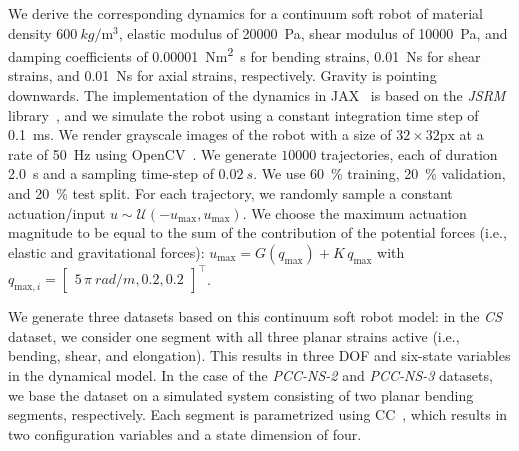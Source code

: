 We derive the corresponding dynamics for a continuum soft robot of material density $\SI{600}{kg \per \meter^3}$, elastic modulus of \SI{20000}{Pa}, shear modulus of \SI{10000}{Pa}, and damping coefficients of \SI{0.00001}{Nm^2s} for bending strains, \SI{0.01}{Ns} for shear strains, and \SI{0.01}{Ns} for axial strains, respectively.
Gravity is pointing downwards.
The implementation of the dynamics in JAX~\citep{jax2018github} is based on the \emph{JSRM} library~\citep{stolzle2024experimental, stolzle2024guiding}, and we simulate the robot using a constant integration time step of \SI{0.1}{ms}.
We render grayscale images of the robot with a size of $32 \times 32 \mathrm{px}$ at a rate of \SI{50}{Hz} using OpenCV~\citep{bradski2000opencv}. 
We generate $10000$ trajectories, each of duration \SI{2.0}{s} and a sampling time-step of $\SI{0.02}{s}$. We use \SI{60}{\percent} training, \SI{20}{\percent} validation, and \SI{20}{\percent} test split.
For each trajectory, we randomly sample a constant actuation/input $u \sim \mathcal{U}(-u_\mathrm{max}, u_\mathrm{max})$. We choose the maximum actuation magnitude to be equal to the sum of the contribution of the potential forces (i.e., elastic and gravitational forces): $u_\mathrm{max} = G(q_\mathrm{max}) + K \, q_\mathrm{max}$ with $q_{\mathrm{max},i} = \begin{bmatrix}
    5 \, \pi~\si{rad \per m}, 0.2, 0.2
\end{bmatrix}^\top$.

We generate three datasets based on this continuum soft robot model: in the \emph{CS} dataset, we consider one segment with all three planar strains active (i.e., bending, shear, and elongation). This results in three \gls{DOF} and six-state variables in the dynamical model. In the case of the \emph{PCC-NS-2} and \emph{PCC-NS-3} datasets, we base the dataset on a simulated system consisting of two planar bending segments, respectively. Each segment is parametrized using \gls{CC}~\citep{webster2010design, rosi2022sensing}, which results in two configuration variables and a state dimension of four.

